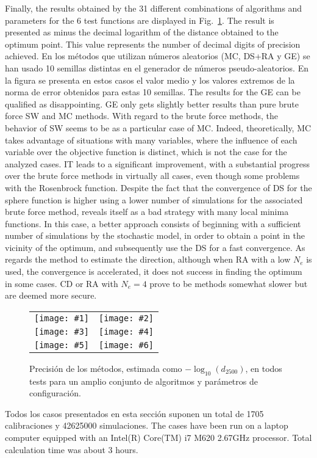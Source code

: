 \documentclass[review,authoryear]{elsarticle}
\newcommand{\FIGVI}[8]
{
	\begin{figure}[ht!]
		\centering
		\begin{tabular}{cc}
			\texttt{[image: \#1]} & \texttt{[image: \#2]} \\
			\texttt{[image: \#3]} & \texttt{[image: \#4]} \\
			\texttt{[image: \#5]} & \texttt{[image: \#6]}
		\end{tabular}
		\caption{#7.\label{#8}}
	\end{figure}
}
\newcommand{\PA}[1]{\left(#1\right)}
\begin{document}
Finally, the results obtained by the 31 different combinations of algorithms
and parameters for the 6 test functions are displayed in
Fig.~\ref{FigTestResults}. 
The result is presented as minus the decimal logarithm of the distance obtained
to the optimum point. This value represents the number of decimal digits of 
precision achieved.
En los métodos que utilizan números aleatorios (MC, DS+RA y GE) se han usado 10
semillas distintas en el generador de números pseudo-aleatorios. En la figura se
presenta en estos casos el valor medio y los valores extremos de la norma de
error obtenidos para estas 10 semillas.
The results for the GE can be qualified as disappointing. GE only gets slightly
better results than pure brute force SW and MC methods.
With regard to the brute force methods, the behavior of SW seems to be as a
particular case of MC. Indeed, theoretically, MC takes advantage of situations
with many variables, where the influence of each  variable over the objective
function is distinct, which is not the case for the analyzed cases.
IT leads to a significant improvement, with a substantial progress over the
brute force methods in virtually all cases, even though some problems with the
Rosenbrock function. 
Despite the fact that the convergence of DS for the sphere function is higher
using a lower number of simulations for the associated brute force method,
reveals itself as a bad strategy with many local minima functions. In this case,
a better approach consists of beginning with a sufficient number of simulations
by the stochastic model, in order to obtain a point in the vicinity of the
optimum, and subsequently use the DS for a fast convergence. As regards the
method to estimate the direction, although when RA with a low $N_e$ is used, the
convergence is accelerated, it does not success in finding the optimum in some
cases. CD or RA with $N_e=4$ prove to be methods somewhat slower but are deemed
more secure.
\FIGVI{Sphere-e.eps}{Ackley-e.eps}{Booth-e.eps}{Rosenbrock-e.eps}{Easom-e.eps}
{Beale-e.eps}{Precisión de los métodos, estimada como $-\log_{10}\PA{d_{2500}}$,
en todos tests para un amplio conjunto de algoritmos y parámetros de
configuración}{FigTestResults}

Todos los casos presentados en esta sección suponen un total de 1705
calibraciones y 42625000 simulaciones. The cases have been run on a laptop
computer equipped with an Intel(R) Core(TM) i7 M620 2.67GHz processor. Total
calculation time was about 3 hours.
\end{document}
